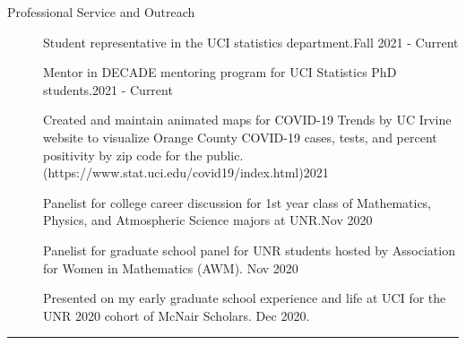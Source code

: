 \documentclass{article}
\begin{document}
\begin{description}
	\vspace{-2mm}
	\item[Professional Service and Outreach]\hspace*{.1in} 
	
		Student representative in the UCI statistics department.\hfill{Fall 2021 - Current}
		
		Mentor in DECADE mentoring program for UCI Statistics PhD students.\hfill{2021 - Current} \\ \vspace{-3mm}
	
		Created and maintain animated maps for COVID-19 Trends by UC Irvine website to visualize Orange County COVID-19 cases, tests, and percent positivity by zip code for the public.\\
		 (https://www.stat.uci.edu/covid19/index.html)\hfill{2021} \\ \vspace{-3mm}
	
		Panelist for college career discussion for 1st year class of Mathematics, Physics, and Atmospheric Science majors at UNR.\hfill{Nov 2020}\\ \vspace{-3mm}
		
		Panelist for graduate school panel for UNR students hosted by Association for Women in Mathematics (AWM). \hfill{Nov 2020}\\ \vspace{-3mm}
		
		Presented on my early graduate school experience and life at UCI for the UNR 2020 cohort of McNair Scholars. \hfill{Dec 2020}.
	
\end{description}
\vspace{-2mm}
\rule{\linewidth}{1pt}


\end{document}
